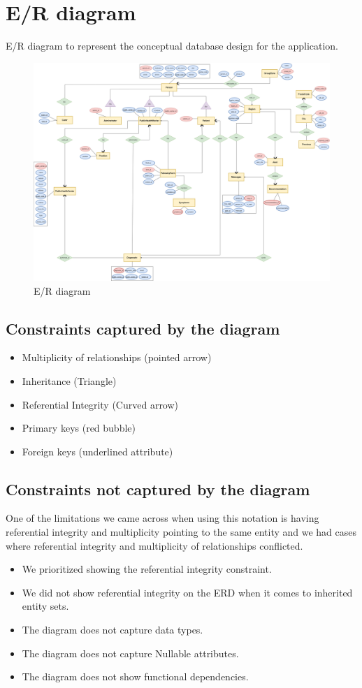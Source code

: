 \documentclass{article}
\begin{document}
\section{E/R diagram}
E/R diagram to represent the conceptual database design for the application.

\begin{figure}[H]
    \centering
    \includegraphics[scale=0.22]{imgs/ERD.PNG}
    \caption{E/R diagram}
\end{figure}

\subsection{Constraints captured by the diagram}
\begin{itemize}
    \item Multiplicity of relationships (pointed arrow)
    \item Inheritance (Triangle)
    \item Referential Integrity (Curved arrow)
    \item Primary keys (red bubble)
    \item Foreign keys (underlined attribute)
\end{itemize}
\subsection{Constraints not captured by the diagram}
One of the limitations we came across when using this notation is having referential integrity and multiplicity pointing to the same entity and we had cases where referential integrity and multiplicity of relationships conflicted.
\begin{itemize}
    \item We prioritized showing the referential integrity constraint. 
    \item We did not show referential integrity on the ERD when it comes to inherited entity sets.
    \item The diagram does not capture data types.
    \item The diagram does not capture Nullable attributes.
    \item The diagram does not show functional dependencies.
\end{itemize} 
\end{document}
